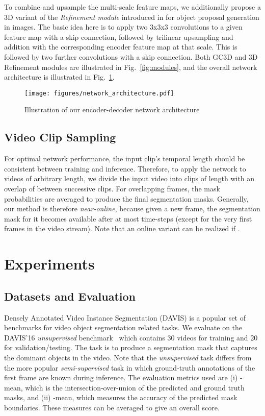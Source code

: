 \documentclass{bmvc2k}
\newcommand{\PAR}[1]{\vskip4pt \noindent {\bf #1~}}
\begin{document}
To combine and upsample the multi-scale feature maps, we additionally propose a 3D variant of the \textit{Refinement module} introduced in \cite{Pinheiro16ECCV} for object proposal generation in images. The basic idea here is to apply two 3x3x3 convolutions to a given feature map with a skip connection, followed by trilinear upsampling and addition with the corresponding encoder feature map at that scale. This is followed by two further convolutions with a skip connection. Both GC3D and 3D Refinement modules are illustrated in Fig.~\ref{fig:modules}, and the overall network architecture is illustrated in Fig.~\ref{fig:network_architecture}.

\begin{figure}
    \centering
    \texttt{[image: figures/network\_architecture.pdf]}
    \caption{Illustration of our encoder-decoder network architecture}
    \label{fig:network_architecture}
\end{figure}

\subsection{Video Clip Sampling}
\label{sec:clip_sampling}

For optimal network performance, the input clip's temporal length should be consistent between training and inference. Therefore, to apply the network to videos of arbitrary length, we divide the input video into clips of length  with an overlap of  between successive clips. For overlapping frames, the mask probabilities are averaged to produce the final segmentation masks. Generally, our method is therefore \textit{near-online}, because given a new frame, the segmentation mask for it becomes available after at most  time-steps (except for the very first  frames in the video stream). Note that an online variant can be realized if .



 
\section{Experiments}
\label{sec:experiments}

\subsection{Datasets and Evaluation}

\PAR{DAVIS'16.} Densely Annotated Video Instance Segmentation (DAVIS) is a popular set of benchmarks for video object segmentation related tasks. We evaluate on the DAVIS'16 \textit{unsupervised} benchmark~\cite{Perazzi16CVPR} which contains 30 videos for training and 20 for validation/testing. 
The task is to produce a segmentation mask that captures the dominant objects in the video. 
Note that the \textit{unsupervised} task differs from the more popular \textit{semi-supervised} task in which ground-truth annotations of the first frame are known during inference. The evaluation metrics used are (i) -mean, which is the intersection-over-union of the predicted and ground truth masks, and (ii) -mean, which measures the accuracy of the predicted mask boundaries. These measures can be averaged to give an overall  score.
\end{document}
